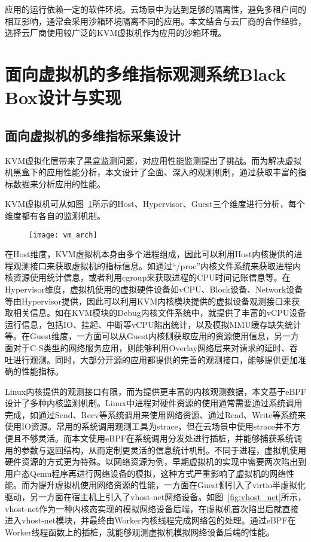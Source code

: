 应用的运行依赖一定的软件环境。云场景中为达到足够的隔离性，避免多租户间的相互影响，通常会采用沙箱环境隔离不同的应用。本文结合与云厂商的合作经验，选择云厂商使用较广泛的KVM虚拟机作为应用的沙箱环境。

\section{面向虚拟机的多维指标观测系统Black Box设计与实现}

\subsection{面向虚拟机的多维指标采集设计}


KVM虚拟化层带来了黑盒监测问题，对应用性能监测提出了挑战。而为解决虚拟机黑盒下的应用性能分析，本文设计了全面、深入的观测机制，通过获取丰富的指标数据来分析应用的性能。

KVM虚拟机可从如图~\ref{fig:vm_arch}所示的Host、Hypervisor、Guest三个维度进行分析，每个维度都有各自的监测机制。

\begin{figure}[!htbp]
    \centering
    \texttt{[image: vm\_arch]}
    \label{fig:vm_arch}
\end{figure}

在Host维度，KVM虚拟机本身由多个进程组成，因此可以利用Host内核提供的进程观测接口来获取虚拟机的指标信息。如通过“/proc”内核文件系统来获取进程内核资源使用统计信息，或者利用cgroup来获取进程的CPU时间记账信息等。在Hypervisor维度，虚拟机使用的虚拟硬件设备如vCPU、Block设备、Network设备等由Hypervisor提供，因此可以利用KVM内核模块提供的虚拟设备观测接口来获取相关信息。如在KVM模块的Debug内核文件系统中，就提供了丰富的vCPU设备运行信息，包括IO、挂起、中断等vCPU陷出统计，以及模拟MMU缓存缺失统计等。在Guest维度，一方面可以从Guest内核侧获取应用的资源使用信息，另一方面对于C-S类型的网络服务应用，则能够利用Overlay网络层来对请求的延时、吞吐进行观测。同时，大部分开源的应用都提供的完善的观测接口，能够提供更加准确的性能指标。

Linux内核提供的观测接口有限，而为提供更丰富的内核观测数据，本文基于eBPF设计了多种内核监测机制。Linux中进程对硬件资源的使用通常需要通过系统调用完成，如通过Send、Recv等系统调用来使用网络资源、通过Read、Write等系统来使用IO资源。常用的系统调用观测工具为strace，但在云场景中使用strace并不方便且不够灵活。而本文使用eBPF在系统调用分发处进行插桩，并能够捕获系统调用的参数与返回结构，从而定制更灵活的信息统计机制。不同于进程，虚拟机使用硬件资源的方式更为特殊。以网络资源为例，早期虚拟机的实现中需要两次陷出到用户态Qemu程序再进行网络设备的模拟，这种方式严重影响了虚拟机的网络性能。而为提升虚拟机使用网络资源的性能，一方面在Guest侧引入了virtio半虚拟化驱动，另一方面在宿主机上引入了vhost-net网络设备。如图~\ref{fig:vhost_net}所示，vhost-net作为一种内核态实现的模拟网络设备后端，在虚拟机首次陷出后就直接进入vhost-net模块，并最终由Worker内核线程完成网络包的处理。通过eBPF在Worker线程函数上的插桩，就能够观测虚拟机模拟网络设备后端的性能。

